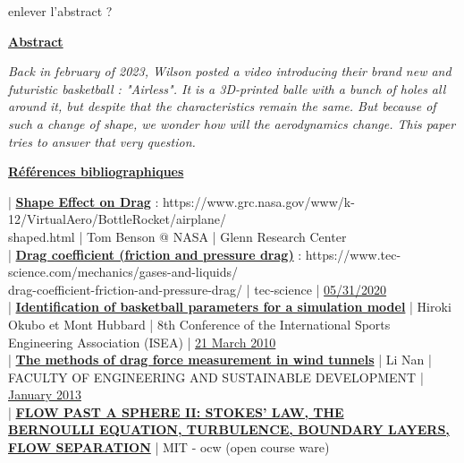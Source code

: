 \documentclass{article}
\newcommand{\vtab} {\vspace{0.4cm}}
\newcommand{\htab} {\hspace{1cm}}
\begin{document}
\vspace{0.6cm}
\vspace{0.6cm}

{\Huge enlever l'abstract ?}

\vspace{0.6cm}

\underline{\Large{\textbf{Abstract}}} \\

\vspace{0.6cm}

\textit{
Back in february of 2023, Wilson posted a video introducing their brand new and futuristic basketball : "Airless". It is a 3D-printed balle with a bunch of holes all around it, but despite that the characteristics remain the same. But because of such a change of shape, we wonder how will the aerodynamics change. This paper tries to answer that very question.
}


\vspace{0.6cm}

\underline{\Large{\textbf{Références bibliographiques}}} \\

\vspace{0.6cm}

\htab {\LARGE $[$ 1 $]$} | \underline{\textbf{Shape Effect on Drag}} : https://www.grc.nasa.gov/www/k-12/VirtualAero/BottleRocket/airplane/ \\ shaped.html | Tom Benson @ NASA | Glenn Research Center \\
\vtab
\htab {\LARGE $[$ 2 $]$} | \underline{\textbf{Drag coefficient (friction and pressure drag)}} : https://www.tec-science.com/mechanics/gases-and-liquids/ \\ drag-coefficient-friction-and-pressure-drag/ | tec-science | \underline{05/31/2020} \\
\vtab
\htab {\LARGE $[$ 3 $]$} | \underline{\textbf{Identification of basketball parameters for a simulation model}} | Hiroki Okubo {\small et} Mont Hubbard | 8th Conference of the International Sports Engineering Association (ISEA) | \underline{21 March 2010} \\
\vtab
\htab {\LARGE $[$ 4 $]$} | \underline{\textbf{The methods of drag force measurement in wind tunnels}} | Li Nan | FACULTY OF ENGINEERING AND SUSTAINABLE DEVELOPMENT | \underline{January 2013} \\
\vtab
\htab {\LARGE $[$ 5 $]$} | \underline{\textbf{FLOW PAST A SPHERE II: STOKES’ LAW, THE}} \\
\underline{\textbf{BERNOULLI EQUATION, TURBULENCE, BOUNDARY LAYERS,}} \\
\underline{\textbf{FLOW SEPARATION}} | MIT - ocw (open course ware)
\end{document}
